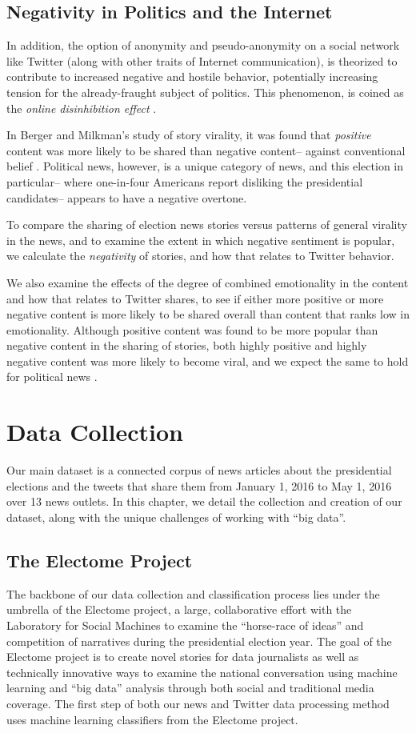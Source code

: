 \documentclass[letterpaper]{article}
\begin{document}
\subsection{Negativity in Politics and the Internet}
In addition, the option of anonymity and pseudo-anonymity on a social network like Twitter (along with other traits of Internet communication), is theorized to contribute to increased negative and hostile behavior, potentially increasing tension for the already-fraught subject of politics. This phenomenon, is coined as the \emph{online disinhibition effect} \cite{suler2004online}. 

In Berger and Milkman’s study of story virality, it was found that \emph{positive} content was more likely to be shared than negative content-- against conventional belief \cite{berger2012makes}. Political news, however, is a unique category of news, and this election in particular-- where one-in-four Americans report disliking the presidential candidates-- appears to have a negative overtone.

To compare the sharing of election news stories versus patterns of general virality in the news, and to examine the extent in which negative sentiment is popular, we calculate the \emph{negativity} of stories, and how that relates to Twitter behavior.

We also examine the effects of the degree of combined emotionality in the content and how that relates to Twitter shares, to see if either more positive or more negative content is more likely to be shared overall than content that ranks low in emotionality. Although positive content was found to be more popular than negative content in the sharing of stories, both highly positive and highly negative content was more likely to become viral, and we expect the same to hold for political news \cite{berger2012makes}. 
 
\section{Data Collection}
 Our main dataset is a connected corpus of news articles about the presidential elections and the tweets that share them from January 1, 2016 to May 1, 2016 over 13 news outlets. In this chapter, we detail the collection and creation of our dataset, along with the unique challenges of working with ``big data''.

\subsection{The Electome Project}
The backbone of our data collection and classification process lies under the umbrella of the Electome project, a large, collaborative effort with the Laboratory for Social Machines to examine the ``horse-race of ideas'' and competition of narratives during the presidential election year. The goal of the Electome project is to create novel stories for data journalists as well as technically innovative ways to examine the national conversation using machine learning and ``big data'' analysis through both social and traditional media coverage. The first step of both our news and Twitter data processing method uses machine learning classifiers from the Electome project.
\end{document}
